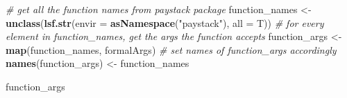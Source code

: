 \documentclass[]{book}
\newenvironment{Shaded}{\begin{snugshade}}{\end{snugshade}}
\newcommand{\KeywordTok}[1]{\textcolor[rgb]{0.13,0.29,0.53}{\textbf{#1}}}
\newcommand{\DataTypeTok}[1]{\textcolor[rgb]{0.13,0.29,0.53}{#1}}
\newcommand{\StringTok}[1]{\textcolor[rgb]{0.31,0.60,0.02}{#1}}
\newcommand{\CommentTok}[1]{\textcolor[rgb]{0.56,0.35,0.01}{\textit{#1}}}
\newcommand{\NormalTok}[1]{#1}
\begin{document}
\begin{Shaded}
\begin{Highlighting}[]
\CommentTok{# get all the function names from paystack package}
\NormalTok{function_names <-}\StringTok{ }\KeywordTok{unclass}\NormalTok{(}\KeywordTok{lsf.str}\NormalTok{(}\DataTypeTok{envir =} \KeywordTok{asNamespace}\NormalTok{(}\StringTok{"paystack"}\NormalTok{), }\DataTypeTok{all =}\NormalTok{ T))}
\CommentTok{# for every element in function_names, get the args the function accepts}
\NormalTok{function_args <-}\StringTok{ }\KeywordTok{map}\NormalTok{(function_names, formalArgs)}
\CommentTok{# set names of function_args accordingly}
\KeywordTok{names}\NormalTok{(function_args) <-}\StringTok{ }\NormalTok{function_names}

\NormalTok{function_args}
\end{Highlighting}
\end{Shaded}
\end{document}
